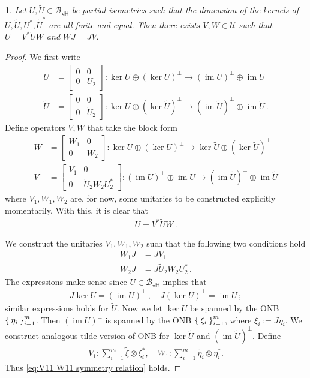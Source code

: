\documentclass[a4paper,10pt]{article}
\numberwithin{equation}{section}
\theoremstyle{plain}
\theoremstyle{plain}
\newtheorem{lem}[thm]{\protect\lemmaname}
\theoremstyle{plain}
\theoremstyle{plain}
\theoremstyle{plain}
\theoremstyle{remark}
\theoremstyle{definition}
\theoremstyle{plain}
\providecommand{\lemmaname}{Lemma}
\newcommand{\calB}{\mathcal{B}}
\newcommand{\calU}{\mathcal{U}}
\newcommand{\ti}[1]{\widetilde{#1}}
\newcommand{\HH}{\mathbb{H}}
\newcommand{\im}{\operatorname{im}}
\newcommand{\eq}[1]{\begin{align*}#1\end{align*}}
\newcommand{\eql}[1]{\begin{align}#1\end{align}}
\begin{document}
	\begin{lem}\label{lem:intertwines U and tiU in star H}
		Let $U,\ti{U}\in\calB_{\star\HH}$ be partial isometries such that the dimension of the kernels of $U,\ti{U},U^*,\ti{U}^*$ are all finite and equal. Then there exists $V,W\in\calU$ such that $U=V^*\ti{U}W$ and $WJ=JV.$
	\end{lem}
	\begin{proof}
		We first write 
		\eq{
			U&=\begin{bmatrix}0 & 0 \\ 0 & U_2\end{bmatrix}:\ker U \oplus (\ker U)^\perp \to (\im U)^\perp \oplus \im U 
			\\ \ti{U}&=\begin{bmatrix}0 & 0 \\ 0 & \ti{U}_{2}\end{bmatrix}:\ker \ti{U} \oplus (\ker \ti{U})^\perp \to (\im \ti{U})^\perp \oplus \im \ti{U}\,.
		} 
		Define operators $V,W$ that take the block form 
		\eq{W&=\begin{bmatrix}W_{1} & 0 \\ 0 & W_{2}\end{bmatrix}:\ker U \oplus (\ker U)^\perp \to \ker \ti{U}\oplus (\ker \ti{U})^\perp \\ V&=\begin{bmatrix}V_{1} & 0 \\ 0 &  \ti{U}_{2}W_{2} U_{2}^*\end{bmatrix}: (\im U)^\perp \oplus \im U \to (\im\ti{U})^\perp \oplus \im \ti{U}}
		where $V_{1},W_{1},W_{2}$ are, for now, some unitaries to be constructed explicitly momentarily. With this, it is clear that \eq{U=V^*\ti{U}W\,.} 
		
		We construct the unitaries $V_{1},W_{1},W_{2}$ such that the following two conditions hold \eql{W_{1}J&=JV_{1} \label{eq:V11 W11 symmetry relation}\\ W_{2}J&=J \ti{U}_{2}W_{2}U_{2}^*\label{eq:V22 W22 symmetry relation}\,.} 
		The expressions make sense since $U\in \calB_{\star\HH}$ implies that \eq{J\ker U=(\im U)^\perp\,,\quad  J(\ker U)^\perp =\im U\,;}
		similar expressions holds for $\ti{U}$. Now we let $\ker U$ be spanned by the ONB $\Set{\eta_i}_{i=1}^m$. Then $(\im U)^\perp$ is spanned by the ONB $\Set{\xi_i}_{i=1}^m$, where $\xi_i:=J\eta_i$. We construct analogous tilde version of ONB for $\ker \ti{U}$ and $(\im \ti{U})^\perp$. Define \eql{V_{1}:\sum_{i=1}^m \ti{\xi}\otimes \xi_i^*,\quad W_{1}:\sum_{i=1}^m\ti{\eta}_i\otimes \eta_i^*.\label{eq:how V11 W11 maps}} 
		Thus \cref{eq:V11 W11 symmetry relation} holds. 
		

\end{proof}
\end{document}
